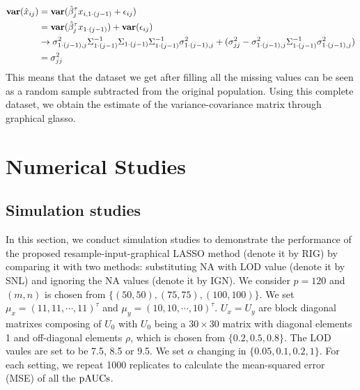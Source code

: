 \documentclass[a4,11pt,epsf, amssymb]{article}
\begin{document}
\begin{equation*}
	\begin{aligned}
{\bf var}(\hat{x}_{ij})  &= {\bf var}(\hat{\beta}_j^{\tau} x_{i,1 \cdot (j-1)} + \epsilon_{ij})  \\
				&={\bf var} (\hat{\beta}_j^{\tau} x_{1 \cdot (j-1)}) + {\bf var}(\epsilon_{ij}) \\
				& \rightarrow  \sigma_{1 \cdot (j-1),j}^2 \Sigma_{1 \cdot (j-1)}^{-1} \Sigma_{1 \cdot (j-1)} \Sigma_{1 \cdot (j-1)}^{-1} \sigma_{1 \cdot (j-1),j}^2 + (\sigma_{jj}^2 - \sigma_{1 \cdot (j-1),j}^2 \Sigma_{1 \cdot (j-1)}^{-1}\sigma_{1 \cdot (j-1),j}^2) \\
				& = \sigma_{jj}^2
	\end{aligned}
\end{equation*}
This means that the dataset we get after filling all the missing values can be seen as a random sample subtracted from the original population.  Using this complete dataset, we obtain the estimate of the variance-covariance matrix through graphical glasso.


\section{Numerical Studies}
\subsection{Simulation studies}

In this section, we conduct simulation studies to demonstrate the performance of the proposed resample-input-graphical LASSO method (denote it by RIG) by comparing it with two methods: substituting NA with LOD value (denote it by SNL) and  ignoring
the NA values (denote it by IGN). We consider $p=120$ and $(m,n)$ is chosen from $\{(50,50),(75,75),(100,100)\}$.
We set $\mu_x=(11,11,\cdots,11)^\tau$ and $\mu_y=(10,10,\cdots,10)^\tau$. $U_x=U_y$ are block diagonal matrixes composing of $U_0$ with $U_0$ being a $30 \times 30$ matrix with diagonal elements 1 and off-diagonal elements $\rho$, which is chosen from $\{0.2,0.5,0.8\}$. The LOD vaules are set to be 7.5, 8.5 or 9.5. We set $\alpha$ changing in $\{0.05,0.1,0.2,1\}$. For each setting, we repeat 1000 replicates to calculate the  mean-squared error (MSE) of all the $\hbox {pAUCs}$.
\end{document}
